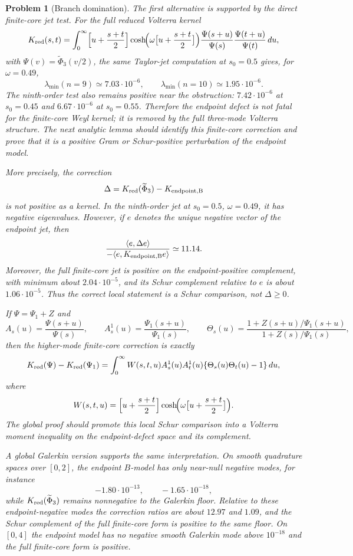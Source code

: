 \documentclass[11pt]{article}
\newtheorem{problem}[theorem]{Problem}
\begin{document}
\begin{problem}[Branch domination]
The first alternative is supported by the direct finite-core jet test.  For the
full reduced Volterra kernel
\[
 K_{\rm red}(s,t)=
 \int_0^\infty
   \Bigl[u+\frac{s+t}{2}\Bigr]
   \cosh\!\Bigl(\omega\bigl[u+\frac{s+t}{2}\bigr]\Bigr)
   \frac{\Psi(s+u)}{\Psi(s)}
   \frac{\Psi(t+u)}{\Psi(t)}\,du,
\]
with $\Psi(v)=\widetilde\Phi_3(v/2)$, the same Taylor-jet computation at
$s_0=0.5$ gives, for $\omega=0.49$,
\[
  \lambda_{\min}(n=9)\simeq 7.03\cdot10^{-6},
  \qquad
  \lambda_{\min}(n=10)\simeq 1.95\cdot10^{-6}.
\]
The ninth-order test also remains positive near the obstruction:
$7.42\cdot10^{-6}$ at $s_0=0.45$ and $6.67\cdot10^{-6}$ at $s_0=0.55$.
Therefore the endpoint defect is not fatal for the finite-core Weyl kernel; it
is removed by the full three-mode Volterra structure.  The next analytic lemma
should identify this finite-core correction and prove that it is a positive
Gram or Schur-positive perturbation of the endpoint model.

More precisely, the correction
\[
  \Delta=K_{\rm red}(\widetilde\Phi_3)-K_{\rm endpoint,B}
\]
is not positive as a kernel.  In the ninth-order jet at $s_0=0.5$,
$\omega=0.49$, it has negative eigenvalues.  However, if $e$ denotes the unique
negative vector of the endpoint jet, then
\[
  \frac{\langle e,\Delta e\rangle}{-\langle e,K_{\rm endpoint,B}e\rangle}
  \simeq 11.14.
\]
Moreover, the full finite-core jet is positive on the endpoint-positive
complement, with minimum about $2.04\cdot10^{-5}$, and its Schur complement
relative to $e$ is about $1.06\cdot10^{-5}$.  Thus the correct local statement
is a Schur comparison, not $\Delta\ge0$.

If $\Psi=\Psi_1+Z$ and
\[
 A_s(u)=\frac{\Psi(s+u)}{\Psi(s)},\qquad
 A_s^1(u)=\frac{\Psi_1(s+u)}{\Psi_1(s)},\qquad
 \Theta_s(u)=
 \frac{1+Z(s+u)/\Psi_1(s+u)}{1+Z(s)/\Psi_1(s)},
\]
then the higher-mode finite-core correction is exactly
\[
 K_{\rm red}(\Psi)-K_{\rm red}(\Psi_1)
 =
 \int_0^\infty W(s,t,u)A_s^1(u)A_t^1(u)
      \{\Theta_s(u)\Theta_t(u)-1\}\,du,
\]
where
\[
 W(s,t,u)=
 \Bigl[u+\frac{s+t}{2}\Bigr]
 \cosh\!\Bigl(\omega\bigl[u+\frac{s+t}{2}\bigr]\Bigr).
\]
The global proof should promote this local Schur comparison into a Volterra
moment inequality on the endpoint-defect space and its complement.

A global Galerkin version supports the same interpretation.  On smooth
quadrature spaces over $[0,2]$, the endpoint $B$-model has only near-null
negative modes, for instance
\[
  -1.80\cdot10^{-13},\qquad -1.65\cdot10^{-18},
\]
while $K_{\rm red}(\widetilde\Phi_3)$ remains nonnegative to the Galerkin
floor.  Relative to these endpoint-negative modes the correction ratios are
about $12.97$ and $1.09$, and the Schur complement of the full finite-core
form is positive to the same floor.  On $[0,4]$ the endpoint model has no
negative smooth Galerkin mode above $10^{-18}$ and the full finite-core form is
positive.


\end{problem}
\end{document}
